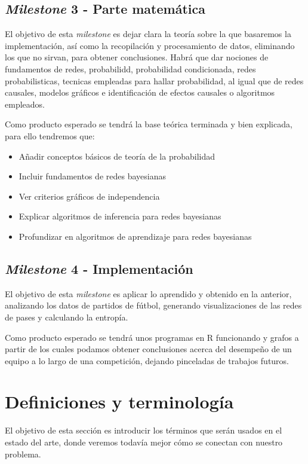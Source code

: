 \subsection{\textit{Milestone} 3 - Parte matemática} 
El objetivo de esta \textit{milestone} es dejar clara la teoría sobre la que basaremos la implementación,
así como la recopilación y procesamiento de datos, eliminando los que no sirvan, para obtener conclusiones. 
Habrá que dar nociones de fundamentos de redes, probabilidd, probabilidad condicionada, redes probabilisticas, 
tecnicas empleadas para hallar probabilidad, al igual que de redes causales, modelos gráficos e identificación de 
efectos causales o algoritmos empleados.

Como producto esperado se tendrá la base teórica terminada y bien explicada, para ello tendremos que: 
\begin{itemize}
    \item Añadir conceptos básicos de teoría de la probabilidad
    \item Incluir fundamentos de redes bayesianas
    \item Ver criterios gráficos de independencia 
    \item Explicar algoritmos de inferencia para redes bayesianas 
    \item Profundizar en algoritmos de aprendizaje para redes bayesianas
\end{itemize}

\subsection{\textit{Milestone} 4 - Implementación} 
El objetivo de esta \textit{milestone} es aplicar lo aprendido y obtenido en la anterior, 
analizando los datos de partidos de fútbol, generando visualizaciones de las redes de pases y 
calculando la entropía.

Como producto esperado se tendrá unos programas en R funcionando y grafos a partir de los cuales 
podamos obtener conclusiones acerca del desempeño de un equipo a lo largo de una competición, dejando 
pinceladas de trabajos futuros.

\section{Definiciones y terminología}
El objetivo de esta sección es introducir los términos que serán usados en el estado del arte, donde veremos 
todavía mejor cómo se conectan con nuestro problema.

